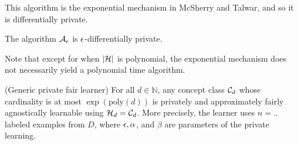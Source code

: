 This algorithm is the exponential mechanism in McSherry and Talwar, and so it is differentially private.

\begin{lemma}
  The algorithm $\mathcal{A}_\epsilon$ is $\epsilon$-differentially private.
\end{lemma}

Note that except for when $|\mathcal{H}|$ is polynomial, the exponential
mechanism does not necessarily yield a polynomial time algorithm.


\begin{theorem}
	(Generic private fair learner) For all $d \in \mathbb{N}$, any
  concept class $\mathcal{C}_d$ whose cardinality is at most
  $\exp(\text{poly}(d))$ is privately and approximately fairly
  agnostically learnable using $\mathcal{H}_d = \mathcal{C}_d$. More precisely, the
  learner uses $n = ..$ labeled examples from $D$, where $\epsilon,
  \alpha$, and $\beta$ are parameters of the private learning.
\end{theorem}

